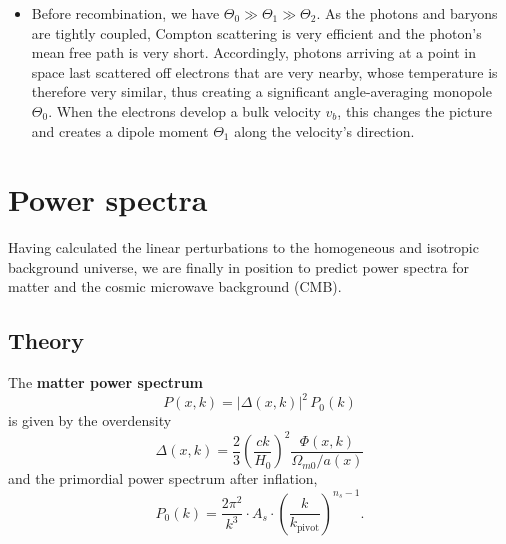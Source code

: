 \documentclass[10pt,a4paper]{article}
\begin{document}
\begin{itemize}
\item
Before recombination, we have $\Theta_0 \gg \Theta_1 \gg \Theta_2$.
As the photons and baryons are tightly coupled,
Compton scattering is very efficient and the photon's mean free path is very short.
Accordingly, photons arriving at a point in space last scattered off electrons that are very nearby,
whose temperature is therefore very similar, thus creating a significant angle-averaging monopole $\Theta_0$.
When the electrons develop a bulk velocity $v_b$, this changes the picture and
creates a dipole moment $\Theta_1$ along the velocity's direction.
\end{itemize}

\clearpage
\section{Power spectra}
\label{sec_power_spectra}

Having calculated the linear perturbations to the homogeneous and isotropic background universe,
we are finally in position to predict power spectra for matter and the cosmic microwave background (CMB).

\subsection{Theory}

The \textbf{matter power spectrum}
\begin{equation}
	P(x,k) = |\Delta(x,k)|^2 \, P_0(k)
\label{eq_Pk}
\end{equation}
is given by the overdensity
\begin{equation}
	\Delta(x,k) = \frac23 \left( \frac{ck}{H_0} \right)^2 \frac{\Phi(x,k)}{\Omega_{m0}/a(x)}
\end{equation}
and the primordial power spectrum after inflation,
\begin{equation}
	P_0(k) = \frac{2\pi^2}{k^3} \cdot A_s \cdot \left( \frac{k}{k_\text{pivot}} \right)^{n_s-1}.
\label{eq_P_primordial}
\end{equation}
\end{document}
